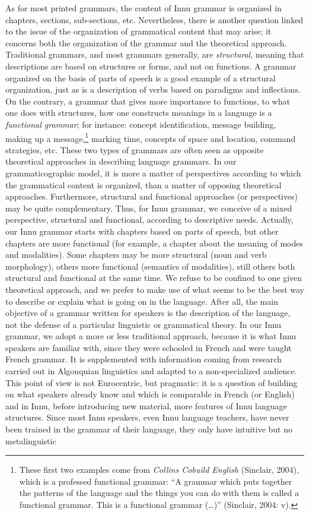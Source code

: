 \documentclass[letterpaper]{article}
\begin{document}
As for most printed grammars, the content of Innu grammar is organized in chapters, sections, sub-sections, etc. Nevertheless, there is another question linked to the issue of the organization of grammatical content that may arise; it concerns both the organization of the grammar and the theoretical approach. Traditional grammars, and most grammars generally, are \textit{structural}, meaning that descriptions are based on structures or forms, and not on functions. A grammar  organized on the basis of parts of speech is a good example of a structural organization, just as is a description of verbs based on paradigms and inflections. On the contrary, a grammar that gives more importance to functions, to what one does with structures, how one constructs meanings in a language is a \textit{functional grammar}; for instance: concept identification, message building, making up a message,\footnote{ These first two examples come from \textit{Collins Cobuild English} (Sinclair, 2004), which is a professed functional grammar: {\textquotedblleft}A grammar which puts together the patterns of the language and the things you can do with them is called a functional grammar. This is a functional grammar ({\dots}){\textquotedblright} (Sinclair, 2004: v).\par } marking time, concepts of space and location, command strategies, etc. These two types of grammars are often seen as opposite theoretical approaches in describing language grammars. In our grammaticographic model, it is more a matter of perspectives according to which the grammatical content is organized, than a matter of opposing theoretical approaches. Furthermore, structural and functional approaches (or perspectives) may be quite complementary. Thus, for Innu grammar, we conceive of a mixed perspective, structural and functional, according to descriptive needs. Actually, our Innu grammar starts with chapters based on parts of speech, but other chapters are more functional (for example, a chapter about the meaning of modes and modalities). Some chapters may be more structural (noun and verb morphology), others more functional (semantics of modalities), still others both structural and functional at the same time. We refuse to be confined to one given theoretical approach, and we prefer to make use of what seems to be the best way to describe or explain what is going on in the language. After all, the main objective of a grammar written for speakers is the description of the language, not the defense of a particular linguistic or grammatical theory. In our Innu grammar, we adopt a more or less traditional approach, because it is what Innu speakers are familiar with, since they were schooled in French and were taught French grammar. It is supplemented with information coming from research carried out in Algonquian linguistics and adapted to a non-specialized audience. This point of view is not Eurocentric, but pragmatic: it is a question of building on what speakers already know and which is comparable in French (or English) and in Innu, before introducing new material, more features of Innu language structures. Since most Innu speakers, even Innu language teachers, have never been trained in the grammar of their language, they only have intuitive but no metalinguistic 
\end{document}
